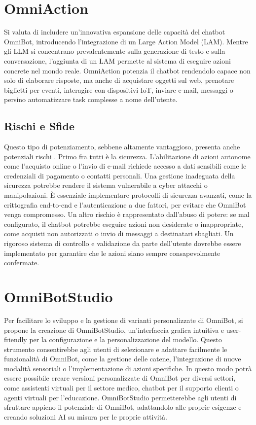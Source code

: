 \section{OmniAction}
Si valuta di includere un'innovativa espansione delle capacità del chatbot OmniBot, introducendo l'integrazione di un Large Action Model (LAM). Mentre gli LLM si concentrano prevalentemente sulla generazione di testo e sulla conversazione, l'aggiunta di un LAM permette al sistema di eseguire azioni concrete nel mondo reale. OmniAction potenzia il chatbot rendendolo capace non solo di elaborare risposte, ma anche di acquistare oggetti sul web, prenotare biglietti per eventi, interagire con dispositivi IoT, inviare e-mail, messaggi o persino automatizzare task complesse a nome dell'utente.

\subsection{Rischi e Sfide}
Questo tipo di potenziamento, sebbene altamente vantaggioso, presenta anche potenziali rischi \cite{shevlane2023modelevaluationextremerisks}. Primo fra tutti è la sicurezza. L'abilitazione di azioni autonome come l'acquisto online o l'invio di e-mail richiede accesso a dati sensibili come le credenziali di pagamento o contatti personali. Una gestione inadeguata della sicurezza potrebbe rendere il sistema vulnerabile a cyber attacchi o manipolazioni. È essenziale implementare protocolli di sicurezza avanzati, come la crittografia end-to-end e l'autenticazione a due fattori, per evitare che OmniBot venga compromesso.
Un altro rischio è rappresentato dall'abuso di potere: se mal configurato, il chatbot potrebbe eseguire azioni non desiderate o inappropriate, come acquisti non autorizzati o invio di messaggi a destinatari sbagliati. Un rigoroso sistema di controllo e validazione da parte dell'utente dovrebbe essere implementato per garantire che le azioni siano sempre consapevolmente confermate.

\section{OmniBotStudio}
Per facilitare lo sviluppo e la gestione di varianti personalizzate di OmniBot, si propone la creazione di OmniBotStudio, un'interfaccia grafica intuitiva e user-friendly per la configurazione e la personalizzazione del modello. Questo strumento consentirebbe agli utenti di selezionare e adattare facilmente le funzionalità di OmniBot, come la gestione delle catene, l'integrazione di nuove modalità sensoriali o l'implementazione di azioni specifiche.
In questo modo potrà essere possibile creare versioni personalizzate di OmniBot per diversi settori, come assistenti virtuali per il settore medico, chatbot per il supporto clienti o agenti virtuali per l'educazione. OmniBotStudio permetterebbe agli utenti di sfruttare appieno il potenziale di OmniBot, adattandolo alle proprie esigenze e creando soluzioni AI su misura per le proprie attività.